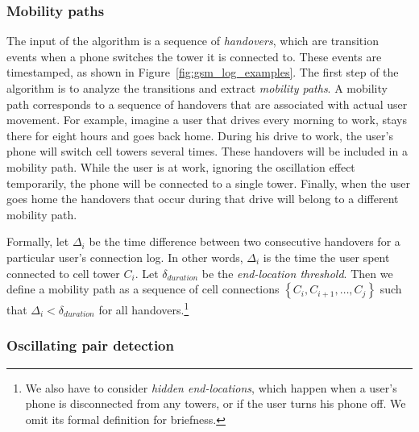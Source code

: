 \documentclass[letterpaper, 12pt, conference]{ieeeconf}
\begin{document}
\subsubsection{Mobility paths}
The input of the algorithm is a sequence of \textit{handovers}, which are 
transition events when a phone switches the tower it is connected to. These 
events are timestamped, as shown in Figure~\ref{fig:gsm_log_examples}. The 
first step of the algorithm is to analyze the transitions and extract \textit{
mobility paths}.  A mobility path corresponds to a sequence of handovers that 
are associated with actual user movement. For example, imagine a user that 
drives every morning to work, stays there for eight hours and goes back home. 
During his drive to work, the user's phone will switch cell towers several 
times. These handovers will be included in a mobility path. While the user is 
at work, ignoring the oscillation effect temporarily, the phone will be 
connected to a single tower. Finally, when the user goes home the 
handovers that occur during that drive will belong to a different mobility path.

Formally, let $\Delta_i$ be the time difference between two consecutive 
handovers for a particular user's connection log. In other words, $\Delta_i$ 
is the time the user spent connected to cell tower $C_i$. Let $\delta_{
duration}$ be the \textit{end-location threshold}. Then we define a mobility 
path as a sequence of cell connections $\left\{C_i, C_{i+1}, \ldots, C_j
\right\}$ such that $\Delta_i < \delta_{duration}$ for all handovers.\footnote
{We also have to consider \textit{hidden end-locations}, which happen when a 
user's phone is disconnected from any towers, or if the user turns his phone 
off. We omit its formal definition for briefness.}


\subsubsection{Oscillating pair detection}
\end{document}
